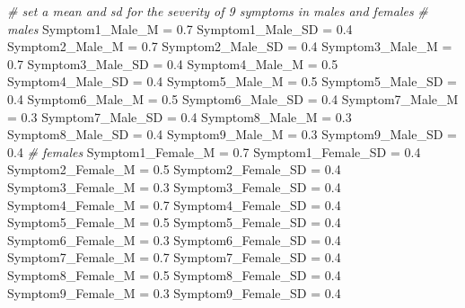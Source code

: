 \documentclass[]{article}
\newenvironment{Shaded}{\begin{snugshade}}{\end{snugshade}}
\newcommand{\FloatTok}[1]{\textcolor[rgb]{0.00,0.00,0.81}{#1}}
\newcommand{\StringTok}[1]{\textcolor[rgb]{0.31,0.60,0.02}{#1}}
\newcommand{\CommentTok}[1]{\textcolor[rgb]{0.56,0.35,0.01}{\textit{#1}}}
\newcommand{\NormalTok}[1]{#1}
\begin{document}
\begin{Shaded}
\begin{Highlighting}[]
{{{{{{{{{{\CommentTok{# set a mean and sd for the severity of 9 symptoms in males and females}
\CommentTok{# males}
\NormalTok{Symptom1_Male_M =}\StringTok{ }\FloatTok{0.7}
\NormalTok{Symptom1_Male_SD =}\StringTok{ }\FloatTok{0.4}
\NormalTok{Symptom2_Male_M =}\StringTok{ }\FloatTok{0.7}
\NormalTok{Symptom2_Male_SD =}\StringTok{ }\FloatTok{0.4}
\NormalTok{Symptom3_Male_M =}\StringTok{ }\FloatTok{0.7}
\NormalTok{Symptom3_Male_SD =}\StringTok{ }\FloatTok{0.4}
\NormalTok{Symptom4_Male_M =}\StringTok{ }\FloatTok{0.5}
\NormalTok{Symptom4_Male_SD =}\StringTok{ }\FloatTok{0.4}
\NormalTok{Symptom5_Male_M =}\StringTok{ }\FloatTok{0.5}
\NormalTok{Symptom5_Male_SD =}\StringTok{ }\FloatTok{0.4}
\NormalTok{Symptom6_Male_M =}\StringTok{ }\FloatTok{0.5}
\NormalTok{Symptom6_Male_SD =}\StringTok{ }\FloatTok{0.4}
\NormalTok{Symptom7_Male_M =}\StringTok{ }\FloatTok{0.3}
\NormalTok{Symptom7_Male_SD =}\StringTok{ }\FloatTok{0.4}
\NormalTok{Symptom8_Male_M =}\StringTok{ }\FloatTok{0.3}
\NormalTok{Symptom8_Male_SD =}\StringTok{ }\FloatTok{0.4}
\NormalTok{Symptom9_Male_M =}\StringTok{ }\FloatTok{0.3}
\NormalTok{Symptom9_Male_SD =}\StringTok{ }\FloatTok{0.4}
\CommentTok{# females}
\NormalTok{Symptom1_Female_M =}\StringTok{ }\FloatTok{0.7}
\NormalTok{Symptom1_Female_SD =}\StringTok{ }\FloatTok{0.4}
\NormalTok{Symptom2_Female_M =}\StringTok{ }\FloatTok{0.5}
\NormalTok{Symptom2_Female_SD =}\StringTok{ }\FloatTok{0.4}
\NormalTok{Symptom3_Female_M =}\StringTok{ }\FloatTok{0.3}
\NormalTok{Symptom3_Female_SD =}\StringTok{ }\FloatTok{0.4}
\NormalTok{Symptom4_Female_M =}\StringTok{ }\FloatTok{0.7}
\NormalTok{Symptom4_Female_SD =}\StringTok{ }\FloatTok{0.4}
\NormalTok{Symptom5_Female_M =}\StringTok{ }\FloatTok{0.5}
\NormalTok{Symptom5_Female_SD =}\StringTok{ }\FloatTok{0.4}
\NormalTok{Symptom6_Female_M =}\StringTok{ }\FloatTok{0.3}
\NormalTok{Symptom6_Female_SD =}\StringTok{ }\FloatTok{0.4}
\NormalTok{Symptom7_Female_M =}\StringTok{ }\FloatTok{0.7}
\NormalTok{Symptom7_Female_SD =}\StringTok{ }\FloatTok{0.4}
\NormalTok{Symptom8_Female_M =}\StringTok{ }\FloatTok{0.5}
\NormalTok{Symptom8_Female_SD =}\StringTok{ }\FloatTok{0.4}
\NormalTok{Symptom9_Female_M =}\StringTok{ }\FloatTok{0.3}
\NormalTok{Symptom9_Female_SD =}\StringTok{ }\FloatTok{0.4}

}}}}}}}}}}
\end{Highlighting}
\end{Shaded}
\end{document}
